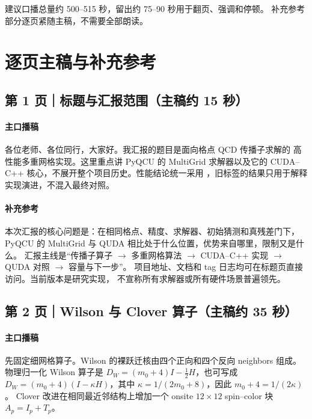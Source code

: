 \documentclass[UTF8,a4paper,11pt,fontset=none]{ctexart}
\newcommand{\code}[1]{\texttt{\detokenize{#1}}}
\begin{document}
建议口播总量约 500--515 秒，留出约 75--90 秒用于翻页、强调和停顿。
补充参考部分逐页紧随主稿，不需要全部朗读。

\section{逐页主稿与补充参考}

\subsection{第 1 页｜标题与汇报范围（主稿约 15 秒）}

\paragraph{主口播稿}
各位老师、各位同行，大家好。我汇报的题目是面向格点 QCD 传播子求解的
高性能多重网格实现。这里重点讲 PyQCU 的 MultiGrid 求解器以及它的
CUDA--C++ 核心，不展开整个项目历史。性能结论统一采用
\code{git tag test27}，旧标签的结果只用于解释实现演进，不混入最终对照。

\paragraph{补充参考}
本次汇报的核心问题是：在相同格点、精度、求解器、初始猜测和真残差门下，
PyQCU 的 MultiGrid 与 QUDA 相比处于什么位置，优势来自哪里，限制又是什么。
汇报主线是“传播子算子 \(\rightarrow\) 多重网格算法 \(\rightarrow\) CUDA--C++
实现 \(\rightarrow\) QUDA 对照 \(\rightarrow\) 容量与下一步”。
项目地址、文档和 tag 日志均可在标题页直接访问。当前版本是研究实现，
不宣称所有求解器或所有硬件场景普遍领先。

\subsection{第 2 页｜Wilson 与 Clover 算子（主稿约 35 秒）}

\paragraph{主口播稿}
先固定细网格算子。Wilson 的裸跃迁核由四个正向和四个反向 neighbors
组成。物理归一化 Wilson 算子是
\(D_W=(m_0+4)I-\frac12H\)，也可写成
\(D_W=(m_0+4)(I-\kappa H)\)，其中
\(\kappa=1/(2m_0+8)\)，因此 \(m_0+4=1/(2\kappa)\)。
Clover 改进在相同最近邻结构上增加一个 onsite \(12\times12\)
spin--color 块 \(A_p=I_p+T_p\)。
\end{document}
